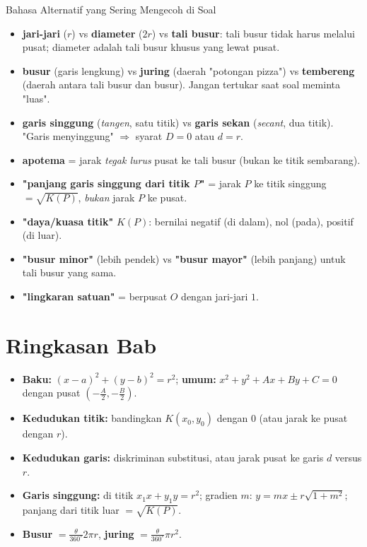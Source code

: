 \documentclass[11pt,a4paper]{report}
\theoremstyle{gaya}
\begin{document}
\begin{konsep}{Bahasa Alternatif yang Sering Mengecoh di Soal}
\begin{itemize}[leftmargin=*,topsep=2pt]
  \item \textbf{jari-jari} ($r$) vs \textbf{diameter} ($2r$) vs \textbf{tali busur}: tali busur tidak harus melalui pusat; diameter adalah tali busur khusus yang lewat pusat.
  \item \textbf{busur} (garis lengkung) vs \textbf{juring} (daerah "potongan pizza") vs \textbf{tembereng} (daerah antara tali busur dan busur). Jangan tertukar saat soal meminta "luas".
  \item \textbf{garis singgung} (\emph{tangen}, satu titik) vs \textbf{garis sekan} (\emph{secant}, dua titik). "Garis menyinggung" $\Rightarrow$ syarat $D=0$ atau $d=r$.
  \item \textbf{apotema} = jarak \emph{tegak lurus} pusat ke tali busur (bukan ke titik sembarang).
  \item \textbf{"panjang garis singgung dari titik $P$"} = jarak $P$ ke titik singgung $=\sqrt{K(P)}$, \emph{bukan} jarak $P$ ke pusat.
  \item \textbf{"daya/kuasa titik"} $K(P)$: bernilai negatif (di dalam), nol (pada), positif (di luar).
  \item \textbf{"busur minor"} (lebih pendek) vs \textbf{"busur mayor"} (lebih panjang) untuk tali busur yang sama.
  \item \textbf{"lingkaran satuan"} = berpusat $O$ dengan jari-jari $1$.
\end{itemize}
\end{konsep}

\section*{Ringkasan Bab}
\begin{itemize}[leftmargin=*,topsep=2pt]
  \item \textbf{Baku:} $(x-a)^2+(y-b)^2=r^2$; \textbf{umum:} $x^2+y^2+Ax+By+C=0$ dengan pusat $\left(-\tfrac A2,-\tfrac B2\right)$.
  \item \textbf{Kedudukan titik:} bandingkan $K(x_0,y_0)$ dengan $0$ (atau jarak ke pusat dengan $r$).
  \item \textbf{Kedudukan garis:} diskriminan substitusi, atau jarak pusat ke garis $d$ versus $r$.
  \item \textbf{Garis singgung:} di titik $x_1x+y_1y=r^2$; gradien $m$: $y=mx\pm r\sqrt{1+m^2}$; panjang dari titik luar $=\sqrt{K(P)}$.
  \item \textbf{Busur} $=\tfrac{\theta}{360^\circ}2\pi r$, \textbf{juring} $=\tfrac{\theta}{360^\circ}\pi r^2$.
\end{itemize}
\end{document}
